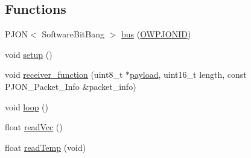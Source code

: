 \subsection*{Functions}
\begin{DoxyCompactItemize}
\item 
P\-J\-O\-N$<$ Software\-Bit\-Bang $>$ \hyperlink{OWP__DG__SensorStation_8ino_a5b555b33c74db25f14ae6a0906d55596}{bus} (\hyperlink{OWP__DG__Si7021__thermo-hygrometer_8ino_aff6283040066cbe0e6d17cbcd83abffc}{O\-W\-P\-J\-O\-N\-I\-D})
\item 
void \hyperlink{OWP__DG__SensorStation_8ino_a4fc01d736fe50cf5b977f755b675f11d}{setup} ()
\item 
void \hyperlink{OWP__DG__SensorStation_8ino_a76fc5e73c141f748dcc1809fdcfa1714}{receiver\-\_\-function} (uint8\-\_\-t $\ast$\hyperlink{Uno__Dragino__LoRa__GPS__Shield__TTN_8ino_a78a402d1762842473567de90b11ed256}{payload}, uint16\-\_\-t length, const P\-J\-O\-N\-\_\-\-Packet\-\_\-\-Info \&packet\-\_\-info)
\item 
void \hyperlink{OWP__DG__SensorStation_8ino_afe461d27b9c48d5921c00d521181f12f}{loop} ()
\item 
float \hyperlink{OWP__DG__SensorStation_8ino_a0b3195c3893f02cb1b80d878b89549d6}{read\-Vcc} ()
\item 
float \hyperlink{OWP__DG__SensorStation_8ino_ada109bb0cdc12131465dfe7a74f93b1e}{read\-Temp} (void)
\end{DoxyCompactItemize}
